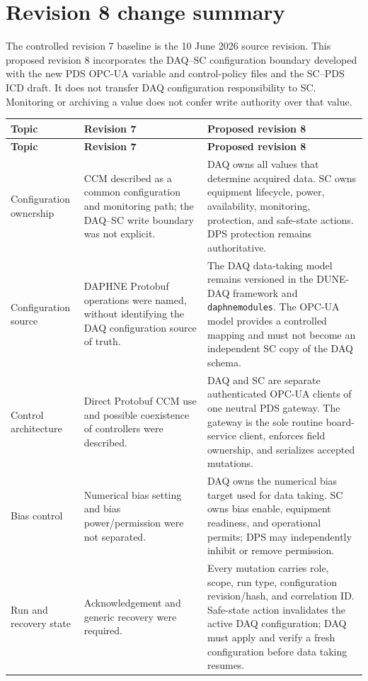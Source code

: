 \section*{Revision 8 change summary}

The controlled revision 7 baseline is the 10 June 2026 source revision. This proposed
revision 8 incorporates the DAQ--SC configuration boundary developed with the new PDS
OPC-UA variable and control-policy files and the SC--PDS ICD draft. It does not transfer
DAQ configuration responsibility to SC. Monitoring or archiving a value does not confer
write authority over that value.

\renewcommand{\arraystretch}{1.12}
\begin{longtable}{@{}p{3.0cm}p{5.7cm}p{6.2cm}@{}}
\toprule
\textbf{Topic} & \textbf{Revision 7} & \textbf{Proposed revision 8} \\
\midrule
\endfirsthead
\toprule
\textbf{Topic} & \textbf{Revision 7} & \textbf{Proposed revision 8} \\
\midrule
\endhead
Configuration ownership & CCM described as a common configuration and monitoring path; the DAQ--SC write boundary was not explicit. & DAQ owns all values that determine acquired data. SC owns equipment lifecycle, power, availability, monitoring, protection, and safe-state actions. DPS protection remains authoritative. \\
Configuration source & DAPHNE Protobuf operations were named, without identifying the DAQ configuration source of truth. & The DAQ data-taking model remains versioned in the DUNE-DAQ framework and \texttt{daphnemodules}. The OPC-UA model provides a controlled mapping and must not become an independent SC copy of the DAQ schema. \\
Control architecture & Direct Protobuf CCM use and possible coexistence of controllers were described. & DAQ and SC are separate authenticated OPC-UA clients of one neutral PDS gateway. The gateway is the sole routine board-service client, enforces field ownership, and serializes accepted mutations. \\
Bias control & Numerical bias setting and bias power/permission were not separated. & DAQ owns the numerical bias target used for data taking. SC owns bias enable, equipment readiness, and operational permits; DPS may independently inhibit or remove permission. \\
Run and recovery state & Acknowledgement and generic recovery were required. & Every mutation carries role, scope, run type, configuration revision/hash, and correlation ID. Safe-state action invalidates the active DAQ configuration; DAQ must apply and verify a fresh configuration before data taking resumes. \\

\end{longtable}
